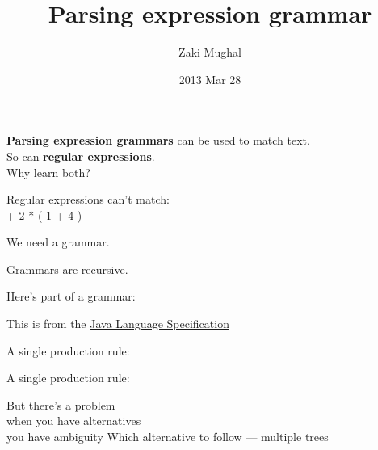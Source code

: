 \documentclass[%
        hyperref={%
                pdfauthor={Zakariyya Mughal},%
                pdfpagemode={None},pdfpagelayout={SinglePage}}%
        xcolor={x11names},%
]{beamer}
\title[PEG]{Parsing expression grammar}
\author{Zaki Mughal}
\institute{University of Houston:\\CougarCS}
\date{2013 Mar 28}
\begin{document}
\frame{\titlepage}

\begin{frame}
	\textbf{Parsing expression grammars} can be used to match text.
	\\\pause\qquad So can \textbf{regular expressions}.
	\\\pause\qquad\qquad Why learn both?
\end{frame}

\begin{frame}[fragile]
	Regular expressions can't match:\\
		 + 2 * ( 1 + 4 )
		\pause 
		\pause 
\end{frame}

\begin{frame}
	\begin{center} \Huge We need a grammar. \end{center}
\end{frame}

\begin{frame}
	\begin{center} \Huge Grammars are recursive. \end{center}
\end{frame}

\begin{frame}
	Here's part of a grammar:
	\begin{framed}
		
	\end{framed}
	This is from the \href{http://docs.oracle.com/javase/specs/jls/se7/html/jls-18.html}{Java Language Specification}
\end{frame}

\begin{frame}
	A single production rule:
	
\end{frame}
\begin{frame}
	A single production rule:
	
\end{frame}

\begin{frame}
	\Huge But there's a problem \\
	\pause \qquad when you have alternatives \\
	\pause \qquad \qquad you have ambiguity
	\pause Which alternative to follow --- multiple trees
\end{frame}
\end{document}
